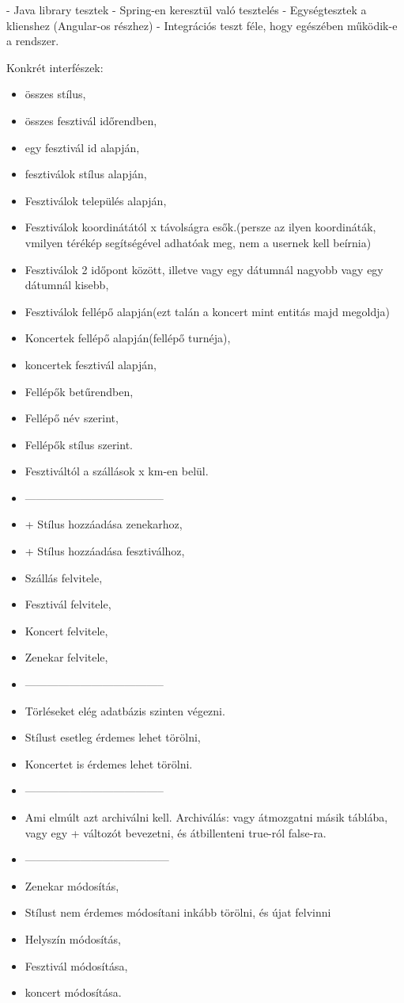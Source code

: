 \documentclass[11pt]{article}
\begin{document}
- Java library tesztek
- Spring-en keresztül való tesztelés
- Egységtesztek a klienshez (Angular-os részhez)
- Integrációs teszt féle, hogy egészében működik-e a rendszer.


Konkrét interfészek:
\begin{itemize}
\item összes stílus,
\item összes fesztivál időrendben,
\item egy fesztivál id alapján,
\item fesztiválok stílus alapján,
\item Fesztiválok település alapján,
\item Fesztiválok koordinátától x távolságra esők.(persze az ilyen koordináták, vmilyen térékép segítségével adhatóak meg, nem a usernek kell beírnia)
\item Fesztiválok 2 időpont között, illetve vagy egy dátumnál nagyobb vagy egy dátumnál kisebb,
\item Fesztiválok fellépő alapján(ezt talán a koncert mint entitás majd megoldja)
\item Koncertek fellépő alapján(fellépő turnéja),
\item koncertek fesztivál alapján,
\item Fellépők betűrendben,
\item Fellépő név szerint,
\item Fellépők stílus szerint.
\item Fesztiváltól a szállások x km-en belül.
\item --------------------------------------
\item + Stílus hozzáadása zenekarhoz, 
\item + Stílus hozzáadása fesztiválhoz,
\item Szállás felvitele,
\item Fesztivál felvitele,
\item Koncert felvitele,
\item Zenekar felvitele,
\item --------------------------------------
\item Törléseket elég adatbázis szinten végezni.
\item Stílust esetleg érdemes lehet törölni,
\item Koncertet is érdemes lehet törölni.
\item --------------------------------------
\item Ami elmúlt azt archiválni kell. Archiválás: vagy átmozgatni másik táblába, vagy egy + változót bevezetni, és átbillenteni true-ról false-ra.
\item ---------------------------------------
\item Zenekar módosítás,
\item Stílust nem érdemes módosítani inkább törölni, és újat felvinni
\item Helyszín módosítás,
\item Fesztivál módosítása, 
\item koncert módosítása.
\end{itemize}
\end{document}
